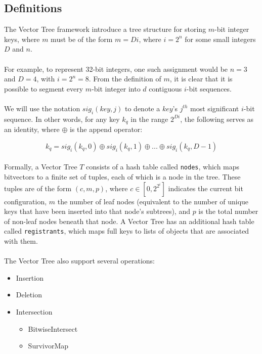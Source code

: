 \documentclass[11pt,letterpaper]{article}
\begin{document}
\subsection{Definitions}

The Vector Tree framework introduce a tree structure for storing
$m$-bit integer keys, where $m$ must be of the form $m=Di$,
where $i=2^n$ for some small integers $D$ and $n$.

\paragraph{}
For example, to represent 32-bit integers, one such assignment
would be $n=3$ and $D=4$, with $i=2^n=8$.  From the definition of
$m$, it is clear that it is possible to segment every $m$-bit integer
into $d$ contiguous $i$-bit sequences.

\paragraph{}
We will use the notation $sig_i(key, j)$ to denote a $key$'s
$j^{th}$ most significant $i$-bit sequence.  In other words,
for any key $k_q$ in the range $2^{Di}$, the following serves as
an identity, where $\oplus$ is the append operator:

\[ k_q = sig_i(k_q, 0) \oplus sig_i(k_q, 1) \oplus ... \oplus sig_i(k_q, D-1) \]

\paragraph{}
Formally, a Vector Tree $T$ consists of a hash table called
{\tt nodes}, which maps bitvectors to a finite set of tuples, each
of which is a node in the tree.  These tuples are of the form $(c, m, p)$,
where $c \in [0, 2^{2^i}]$ indicates the current bit configuration,
$m$ the number of leaf nodes (equivalent to the number of unique
keys that have been inserted into that node's subtrees), and $p$
is the total number of non-leaf nodes beneath that node.  A Vector
Tree has an additional hash table called {\tt registrants}, which maps
full keys to lists of objects that are associated with them.

\paragraph{}
The Vector Tree also support several operations:

\begin{itemize}
	\item Insertion
	\item Deletion
	\item Intersection
		\begin{itemize}
			\item BitwiseIntersect
			\item SurvivorMap
		\end{itemize}
\end{itemize}
\end{document}
